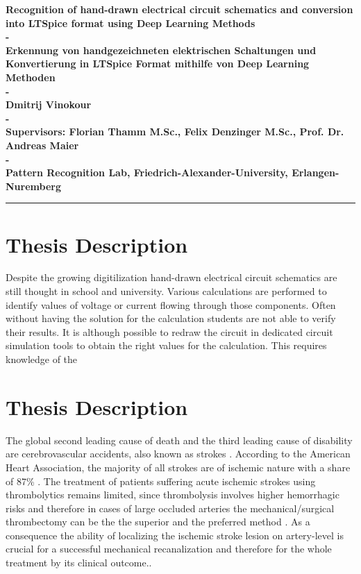 \documentclass{article}%
\begin{document}
\begin{center}

\textbf{
        \huge{Recognition of hand-drawn electrical circuit schematics and conversion into LTSpice format using Deep Learning Methods}
        \\-\\
        \large{Erkennung von handgezeichneten elektrischen Schaltungen und Konvertierung in LTSpice Format mithilfe von Deep Learning Methoden}
        \\-\\
        Dmitrij Vinokour
        \\-\\
        Supervisors: Florian Thamm M.Sc., Felix Denzinger M.Sc., Prof. Dr. Andreas Maier
        \\-\\
        Pattern Recognition Lab, Friedrich-Alexander-University, Erlangen-Nuremberg
}
\noindent\rule{\textwidth}{1pt}

\section*{Thesis Description}
Despite the growing digitilization hand-drawn electrical circuit schematics are still thought in school and university. Various calculations are performed to identify values of voltage or current flowing through those components. Often without having the solution for the calculation students are not able to verify their results. It is although possible to redraw the circuit in dedicated circuit simulation tools to obtain the right values for the calculation. This requires knowledge of the



\section*{Thesis Description}
The global second leading cause of death and the third leading cause of disability are cerebrovascular accidents, also known as strokes \cite{JohnsonStroke, DONNAN20081612}. According to the American Heart Association, the majority of all strokes are of ischemic nature with a share of 87\% \cite{mozaffarian2016heart}. The treatment of patients suffering acute ischemic strokes using thrombolytics remains limited, since thrombolysis involves higher hemorrhagic risks and therefore in cases of large occluded arteries the mechanical/surgical thrombectomy can be the the superior and the preferred method \cite{torbey2013stroke, el2017thrombolysis}. As a consequence the ability of localizing the ischemic stroke lesion on artery-level is crucial for a successful mechanical recanalization and therefore for the whole treatment by its clinical outcome.\cite{torbey2013stroke, palaniswami2015mechanical}.\\\\


\end{center}
\end{document}
